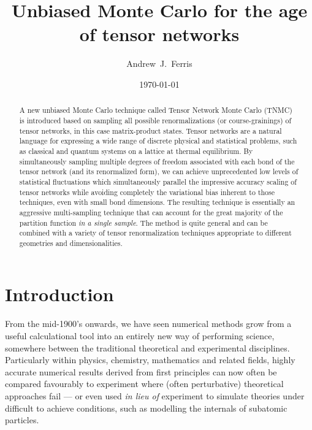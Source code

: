 \documentclass[aps,prl,nopacs,twocolumn]{revtex4}
\begin{document}
\title{Unbiased Monte Carlo for the age of tensor networks}

\author{Andrew~J.~Ferris}

\date{\today}

\begin{abstract}
A new unbiased Monte Carlo technique called Tensor Network Monte Carlo (TNMC) is introduced based on sampling all possible renormalizations (or course-grainings) of tensor networks, in this case matrix-product states. Tensor networks are a natural language for expressing a wide range of discrete physical and statistical problems, such as classical and quantum systems on a lattice at thermal equilibrium. By simultaneously sampling multiple degrees of freedom associated with each bond of the tensor network (and its renormalized form), we can achieve unprecedented low levels of statistical fluctuations which simultaneously parallel the impressive accuracy scaling of tensor networks while avoiding completely the variational bias inherent to those techniques, even with small bond dimensions. The resulting technique is essentially an aggressive multi-sampling technique that can account for the great majority of the partition function \emph{in a single sample}. The method is quite general and can be combined with a variety of tensor renormalization techniques appropriate to different geometries and dimensionalities.
\end{abstract}


\maketitle

\section{Introduction}

From the mid-1900's onwards, we have seen numerical methods grow from a useful calculational tool into an entirely new way of performing science, somewhere between the traditional theoretical and experimental disciplines. Particularly within physics, chemistry, mathematics and related fields, highly accurate numerical results derived from first principles can now often be compared favourably to experiment where (often perturbative) theoretical approaches fail --- or even used \emph{in lieu of} experiment to simulate theories under difficult to achieve conditions, such as modelling the internals of subatomic particles.
\end{document}
